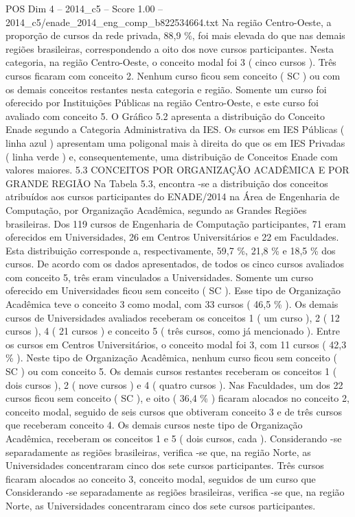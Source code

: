 \begin{textsample}{POS Dim 4 – 2014\_c5 – Score 1.00 – 2014\_c5/enade\_2014\_eng\_comp\_b822534664.txt}
Na região Centro-Oeste, a proporção de cursos da rede privada, 88,9 \%, foi mais elevada do que nas demais regiões brasileiras, correspondendo a oito dos nove cursos participantes.
Nesta categoria, na região Centro-Oeste, o conceito modal foi 3 ( cinco cursos ).
Três cursos ficaram com conceito 2.
Nenhum curso ficou sem conceito ( SC ) ou com os demais conceitos restantes nesta categoria e região.
Somente um curso foi oferecido por Instituições Públicas na região Centro-Oeste, e este curso foi avaliado com conceito 5.
O Gráfico 5.2 apresenta a distribuição do Conceito Enade segundo a Categoria Administrativa da IES.
Os cursos em IES Públicas ( linha azul ) apresentam uma poligonal mais à direita do que os em IES Privadas ( linha verde ) e, consequentemente, uma distribuição de Conceitos Enade com valores maiores. 5.3 CONCEITOS POR ORGANIZAÇÃO ACADÊMICA E POR GRANDE REGIÃO Na Tabela 5.3, encontra -se a distribuição dos conceitos atribuídos aos cursos participantes do ENADE/2014 na Área de Engenharia de Computação, por Organização Acadêmica, segundo as Grandes Regiões brasileiras.
Dos 119 cursos de Engenharia de Computação participantes, 71 eram oferecidos em Universidades, 26 em Centros Universitários e 22 em Faculdades.
Esta distribuição corresponde a, respectivamente, 59,7 \%, 21,8 \% e 18,5 \% dos cursos.
De acordo com os dados apresentados, de todos os cinco cursos avaliados com conceito 5, três eram vinculados a Universidades.
Somente um curso oferecido em Universidades ficou sem conceito ( SC ).
Esse tipo de Organização Acadêmica teve o conceito 3 como modal, com 33 cursos ( 46,5 \% ).
Os demais cursos de Universidades avaliados receberam os conceitos 1 ( um curso ), 2 ( 12 cursos ), 4 ( 21 cursos ) e conceito 5 ( três cursos, como já mencionado ).
Entre os cursos em Centros Universitários, o conceito modal foi 3, com 11 cursos ( 42,3 \% ).
Neste tipo de Organização Acadêmica, nenhum curso ficou sem conceito ( SC ) ou com conceito 5.
Os demais cursos restantes receberam os conceitos 1 ( dois cursos ), 2 ( nove cursos ) e 4 ( quatro cursos ).
Nas Faculdades, um dos 22 cursos ficou sem conceito ( SC ), e oito ( 36,4 \% ) ficaram alocados no conceito 2, conceito modal, seguido de seis cursos que obtiveram conceito 3 e de três cursos que receberam conceito 4.
Os demais cursos neste tipo de Organização Acadêmica, receberam os conceitos 1 e 5 ( dois cursos, cada ).
Considerando -se separadamente as regiões brasileiras, verifica -se que, na região Norte, as Universidades concentraram cinco dos sete cursos participantes.
Três cursos ficaram alocados ao conceito 3, conceito modal, seguidos de um curso que Considerando -se separadamente as regiões brasileiras, verifica -se que, na região Norte, as Universidades concentraram cinco dos sete cursos participantes.

\end{textsample}
